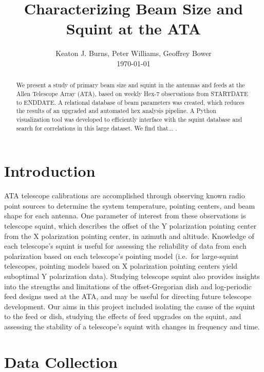\documentclass[preprint]{aastex}
\begin{document}
\title{Characterizing Beam Size and Squint at the ATA}
\author{Keaton J. Burns, Peter Williams, Geoffrey Bower \\ \today}

\begin{abstract}
We present a study of primary beam size and squint in the antennas and feeds at the Allen Telescope Array
(ATA), based on weekly Hex-7 observations from STARTDATE to ENDDATE.  A relational database
of beam parameters was created, which reduces the results of an
upgraded and automated hex analysis pipeline.  A Python visualization
tool was developed to efficiently interface with the squint database
and search for correlations in this large dataset.  We find that...  .  
\end{abstract}

\tableofcontents


\section{Introduction}\label{s.intro}
ATA telescope calibrations are accomplished through observing known
radio point sources to determine the system temperature, pointing
centers, and beam shape for each antenna.  One parameter of interest
from these observations is telescope squint, which describes the
offset of the Y polarization pointing center from the X polarization
pointing center, in azimuth and altitude.  Knowledge of each
telescope's squint is useful for assessing the reliability of data
from each polarization based on each telescope's pointing model
(i.e.~for large-squint telescopes, pointing models based on X polarization pointing centers yield suboptimal Y polarization data). Studying telescope squint also
provides insights into the strengths and limitations of the offset-Gregorian dish and log-periodic feed designs 
used at the ATA, and may be useful for directing future telescope
development.  Our aims in this project included isolating the cause of
the squint to the feed or dish, studying the effects of feed upgrades
on the squint, and assessing the stability of a telescope's squint
with changes in frequency and time.


\section{Data Collection}\label{s.datacollection}
\end{document}
